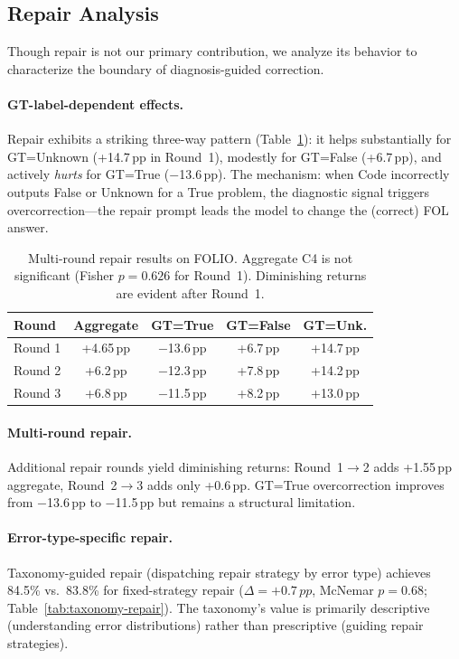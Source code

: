 \documentclass[11pt,a4paper]{article}
\newcommand{\pp}{\,pp}
\begin{document}
\subsection{Repair Analysis}
\label{sec:repair}

Though repair is not our primary contribution, we analyze its behavior to characterize the boundary of diagnosis-guided correction.

\paragraph{GT-label-dependent effects.}
Repair exhibits a striking three-way pattern (Table~\ref{tab:repair-gt}): it helps substantially for GT=Unknown (+14.7\pp{} in Round~1), modestly for GT=False (+6.7\pp{}), and actively \emph{hurts} for GT=True ($-$13.6\pp{}).
The mechanism: when Code incorrectly outputs False or Unknown for a True problem, the diagnostic signal triggers overcorrection---the repair prompt leads the model to change the (correct) FOL answer.

\begin{table}[t]
\centering
\small
\begin{tabular}{lcccc}
\toprule
\textbf{Round} & \textbf{Aggregate} & \textbf{GT=True} & \textbf{GT=False} & \textbf{GT=Unk.} \\
\midrule
Round 1 & +4.65\pp{} & $-$13.6\pp{} & +6.7\pp{} & +14.7\pp{} \\
Round 2 & +6.2\pp{} & $-$12.3\pp{} & +7.8\pp{} & +14.2\pp{} \\
Round 3 & +6.8\pp{} & $-$11.5\pp{} & +8.2\pp{} & +13.0\pp{} \\
\bottomrule
\end{tabular}
\caption{Multi-round repair results on FOLIO. Aggregate C4 is not significant (Fisher $p{=}0.626$ for Round~1). Diminishing returns are evident after Round~1.}
\label{tab:repair-gt}
\end{table}

\paragraph{Multi-round repair.}
Additional repair rounds yield diminishing returns: Round~1$\to$2 adds +1.55\pp{} aggregate, Round~2$\to$3 adds only +0.6\pp{}.
GT=True overcorrection improves from $-$13.6\pp{} to $-$11.5\pp{} but remains a structural limitation.

\paragraph{Error-type-specific repair.}
Taxonomy-guided repair (dispatching repair strategy by error type) achieves 84.5\% vs.\ 83.8\% for fixed-strategy repair ($\Delta{=}{+}0.7\pp{}$, McNemar $p{=}0.68$; Table~\ref{tab:taxonomy-repair}).
The taxonomy's value is primarily descriptive (understanding error distributions) rather than prescriptive (guiding repair strategies).
\end{document}

